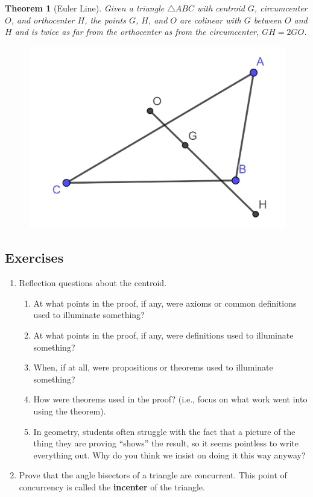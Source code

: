 \documentclass[
]{book}
\providecommand{\tightlist}{%
  \setlength{\itemsep}{0pt}\setlength{\parskip}{0pt}}
\newtheorem{theorem}{Theorem}[chapter]
\theoremstyle{definition}
\theoremstyle{definition}
\theoremstyle{definition}
\theoremstyle{definition}
\theoremstyle{remark}
\begin{document}
\begin{theorem}[Euler Line]
Given a triangle \(\triangle ABC\) with centroid \(G\), circumcenter \(O\), and orthocenter \(H\), the points \(G\), \(H\), and \(O\) are colinear with \(G\) between \(O\) and \(H\) and is twice as far from the orthocenter as from the circumcenter, \(GH=2GO\).
\end{theorem}

\begin{figure}

{\centering \includegraphics[width=0.3\linewidth]{images/EulerLine} 

}

\end{figure}

\hypertarget{exercises-41}{%
\subsection{Exercises}\label{exercises-41}}

\begin{enumerate}
\def\labelenumi{\arabic{enumi}.}
\item
  Reflection questions about the centroid.

  \begin{enumerate}
  \def\labelenumii{\alph{enumii}.}
  \tightlist
  \item
    At what points in the proof, if any, were axioms or common definitions used to illuminate something?
  \item
    At what points in the proof, if any, were definitions used to illuminate something?
  \item
    When, if at all, were propositions or theorems used to illuminate something?
  \item
    How were theorems used in the proof? (i.e., focus on what work went into using the theorem).
  \item
    In geometry, students often struggle with the fact that a picture of the thing they are proving ``shows'' the result, so it seems pointless to write everything out. Why do you think we insist on doing it this way anyway?
  \end{enumerate}
\item
  Prove that the angle bisectors of a triangle are concurrent. This point of concurrency is called the \textbf{incenter} of the triangle.
\end{enumerate}
\end{document}
